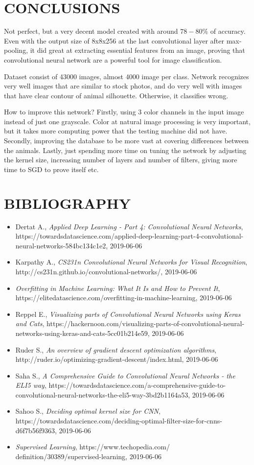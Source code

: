 \documentclass[conference]{IEEEtran}
\begin{document}
\section{CONCLUSIONS}
Not perfect, but a very decent model created with around $78-80\%$ of accuracy. Even with the output size of 8x8x256 at the last convolutional layer after max-pooling, it did great at extracting essential features from an image, proving that convolutional neural network are a powerful tool for image classification.

Dataset consist of 43000 images, almost 4000 image per class. Network recognizes very well images that are similar to stock photos, and do very well with images that have clear contour of animal silhouette.  Otherwise, it classifies wrong.

How to improve this network? Firstly, using 3 color channels in the input image instead of just one grayscale. Color at natural image processing is very important, but it takes more computing power that the testing machine did not have. Secondly, improving the database to be  more vast at covering differences between the animals. Lastly, just spending more time on tuning the network by adjusting the kernel size, increasing number of layers and number of filters, giving more time to SGD to prove itself etc.

\section{BIBLIOGRAPHY}
\begin{itemize}
    \item Dertat A., \textit{Applied Deep Learning - Part 4: Convolutional Neural Networks}, https://towardsdatascience.com/applied-deep-learning-part-4-convolutional-neural-networks-584bc134c1e2, 2019-06-06
    \item Karpathy A., \textit{CS231n Convolutional Neural Networks for Visual Recognition}, http://cs231n.github.io/convolutional-networks/,  2019-06-06
    \item \textit{Overfitting in Machine Learning: What It Is and How to Prevent It}, https://elitedatascience.com/overfitting-in-machine-learning, 2019-06-06
    \item Reppel E., \textit{Visualizing parts of Convolutional Neural Networks using Keras and Cats}, https://hackernoon.com/visualizing-parts-of-convolutional-neural-networks-using-keras-and-cats-5cc01b214e59, 2019-06-06 
    \item Ruder S., \textit{An overview of gradient descent optimization algorithms}, http://ruder.io/optimizing-gradient-descent/index.html, 2019-06-06
    \item Saha S., \textit{A Comprehensive Guide to Convolutional Neural Networks - the ELI5 way}, https://towardsdatascience.com/a-comprehensive-guide-to-convolutional-neural-networks-the-eli5-way-3bd2b1164a53, 2019-06-06   
    \item Sahoo S., \textit{Deciding optimal kernel size for CNN}, https://towardsdatascience.com/deciding-optimal-filter-size-for-cnns-d6f7b56f9363, 2019-06-06  
    \item \textit{Supervised Learning}, https://www.techopedia.com/
    definition/30389/supervised-learning, 2019-06-06    
\end{itemize}
\end{document}
